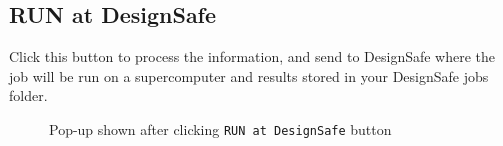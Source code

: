\subsection{RUN at DesignSafe}
Click this button to process the information, and send to DesignSafe
where the job will be run on a supercomputer and results stored in
your DesignSafe jobs folder.

\begin{figure}[!htbp]
  \caption{Pop-up shown after clicking \texttt{RUN at DesignSafe} button}
  \label{fig:remote_button}
\end{figure}

